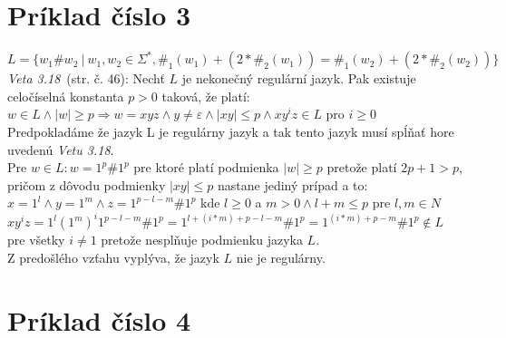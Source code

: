 \documentclass[11pt,a4paper]{article}
\begin{document}
\newpage
\section{Príklad číslo 3}
$L = \{ w_1\#w_2\ |\ w_1,w_2 \in \Sigma^*, \#_1(w_1) + (2 * \#_2(w_1)) = \#_1(w_2) + (2 * \#_2(w_2))\}$\\

\textit{Veta 3.18}~\cite{TIN}(str. č. 46): Nechť $L$ je nekonečný regulární jazyk. Pak existuje celočíselná konstanta $p>0$ taková, že platí: $w \in L \wedge |w| \geq p \Rightarrow w = xyz \wedge y \neq \varepsilon \wedge |xy| \leq p \wedge xy^iz \in L$ pro $i \geq 0$\\

Predpokladáme že jazyk L je regulárny jazyk a tak tento jazyk musí spĺňať hore uvedenú \textit{Vetu 3.18}.\\

Pre $w \in L: w=1^p\#1^p$ pre ktoré platí podmienka $|w| \geq p$ pretože platí $2p+1>p$, pričom z dôvodu podmienky $|xy| \leq p$ nastane jediný prípad a to:\\

$x=1^l \wedge y=1^m \wedge z=1^{p-l-m}\#1^p$ kde $l \geq 0$ a $m > 0 \wedge l+m \leq p$ pre $l,m \in N$\\

$xy^iz = 1^l(1^{m})^i1^{p-l-m}\#1^p = 1^{l+(i*m)+p-l-m}\#1^p = 1^{(i*m)+p-m}\#1^p \notin L$ pre všetky $i \neq 1$ pretože nesplňuje podmienku jazyka $L$.\\

Z predošlého vzťahu vyplýva, že jazyk $L$ nie je regulárny.



\newpage
\section{Príklad číslo 4}
\end{document}
